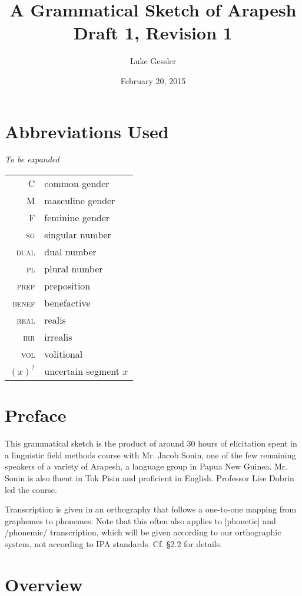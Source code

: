 \documentclass[pdftex,12pt,letterpaper]{article}
\title{A Grammatical Sketch of Arapesh \\ Draft 1, Revision 1}
\author{Luke Gessler}
\date{February 20, 2015}
\begin{document}

\tableofcontents
\listoffigures
\pagebreak
\section*{Abbreviations Used}
\emph{To be expanded} \\

\begin{tabular}{rl}
\textsc{C} & common gender \\
\textsc{M} & masculine gender \\
\textsc{F} & feminine gender \\
\textsc{sg} & singular number \\
\textsc{dual} & dual number \\
\textsc{pl} & plural number \\
\textsc{prep} & preposition \\
\textsc{benef} & benefactive \\
\textsc{real} & realis \\
\textsc{irr} & irrealis \\
\textsc{vol} & volitional \\
$(x)^?$ & uncertain segment $x$ \\

\end{tabular}
\pagebreak
\doublespacing

\section*{Preface}

This grammatical sketch is the product of around 30 hours of elicitation spent in a linguistic field methods course with Mr. Jacob Sonin, one of the few remaining speakers of a variety of Arapesh, a language group in Papua New Guinea. Mr. Sonin is also fluent in Tok Pisin and proficient in English. Professor Lise Dobrin led the course.

Transcription is given in an orthography that follows a one-to-one mapping from graphemes to phonemes. Note that this often also applies to [phonetic] and /phonemic/ transcription, which will be given according to our orthographic system, not according to IPA standards. Cf. \S 2.2 for details.

\section{Overview}
\end{document}
